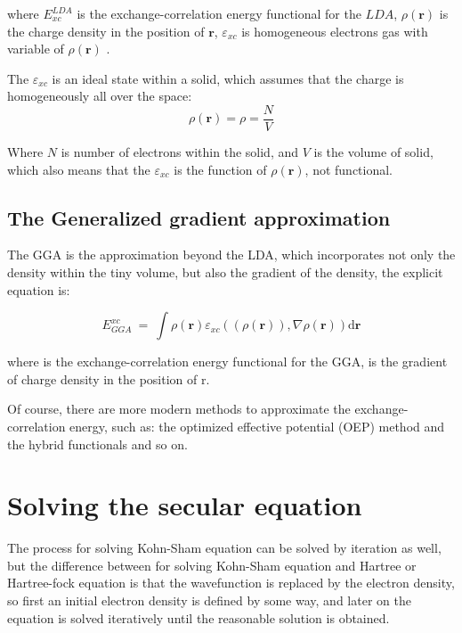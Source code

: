 \documentclass[a4paper]{report}
\begin{document}
\noindent where $ E^\textit{LDA}_\textit{xc} $ is the exchange-correlation energy functional for the $LDA$, $\rho(\textbf{r})$ is the charge density in the position of $\textbf{r}$, $\varepsilon_\textit{xc}$ is homogeneous 
electrons gas with variable of  $\rho(\textbf{r})$ .

\noindent The $\varepsilon_\textit{xc}$ is an ideal state within a solid, which assumes that the charge is homogeneously all over the space:
\begin{equation}
 \rho(\textbf{r}) = \rho = \frac{N}{V}
\end{equation}

\noindent Where $N$ is number of electrons within the solid, and $V$ is the volume of solid, which also means that the $\varepsilon_\textit{xc}$ is the function of $\rho(\textbf{r})$,
 not functional. 
\subsection{The Generalized gradient approximation}
\noindent The GGA is the approximation beyond the LDA, which incorporates not only the density within the tiny volume, but also the gradient
 of the density, the explicit equation is:

\begin{equation}
E_{\textit{GGA}}^{\textit{xc}}\ = \ \int \rho(\textbf{r}) \varepsilon_\textit{xc}( (\rho(\textbf{r})), \nabla \rho(\textbf{r}) ) \mathrm{d} \textbf{r} 
\end{equation}

\noindent where  is the exchange-correlation energy functional for the GGA,  is the gradient  of charge density in the position of r.

\noindent Of course, there are more modern methods to approximate the exchange-correlation energy, such as: the optimized effective potential
(OEP) method and the hybrid functionals and so on.

\section{Solving the secular equation}
\noindent The process for solving Kohn-Sham equation can be solved by iteration as well, but the difference between for solving Kohn-Sham 
equation and Hartree or Hartree-fock equation is that the wavefunction is replaced by the electron density, so first an initial 
electron density is defined by some way, and later on the equation is solved iteratively until the reasonable solution is obtained.
\end{document}
